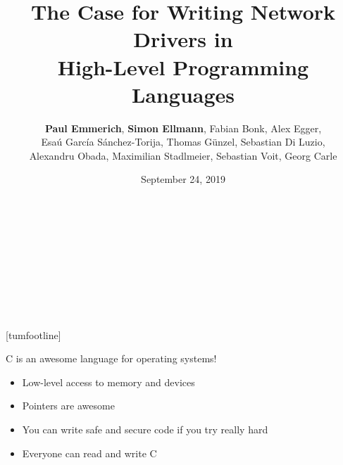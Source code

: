 \documentclass[NET,english,aspectratio=169,notitleframe]{tumbeamer}
\author[Paul Emmerich, Simon Ellmann]{\textbf{Paul Emmerich}, \textbf{Simon Ellmann}, Fabian Bonk, Alex Egger,\\ Esaú García Sánchez-Torija, Thomas Günzel, Sebastian Di Luzio,\\Alexandru Obada, Maximilian Stadlmeier, Sebastian Voit, Georg Carle}
\title{The Case for Writing Network Drivers in\\ High-Level Programming Languages}
\date{September 24, 2019}
\begin{document}
  \begin{frame}[c,noframenumbering]
  \centering%
  \Large%
  \strut\textcolor{TUMBlue}{\inserttitle}%
  \\[4ex]%
  \normalsize%
\footnotesize  \strut\insertauthor%
  \\[2ex]%
  \footnotesize%
  \insertdate%
  \\[4ex]%
  \ifdefined\departmentname%
    \ifdefined\chairname%
      \chairname\\%
    \fi%
    \departmentname\\%
  \fi%
  \TUMname\\%
\end{frame}
[tumfootline]

\begin{frame}{C is an awesome language for operating systems!}
\begin{itemize}
\item Low-level access to memory and devices
\item Pointers are awesome
\item You can write safe and secure code if you try really hard
\item Everyone can read and write C
\end{itemize}
\end{frame}
\end{document}
